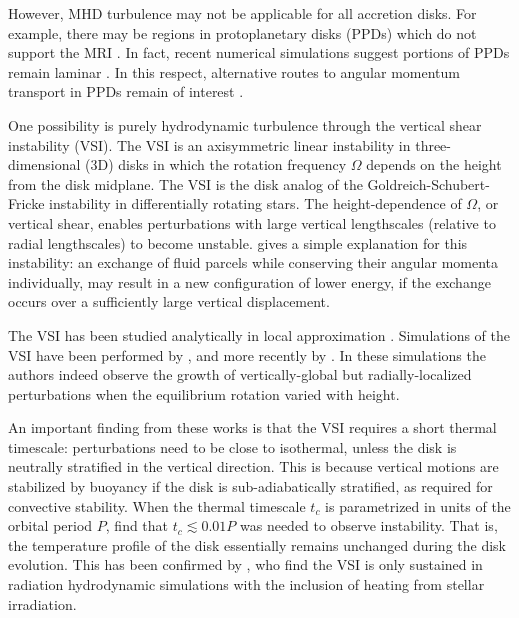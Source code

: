\documentclass[iop]{emulateapj}
\begin{document}
However, MHD turbulence may not be applicable for all  
accretion disks. For example, there may be regions in protoplanetary  
disks (PPDs) which do not support the MRI 
\citep{gammie96,landry13}. In fact, recent  numerical simulations
suggest portions of PPDs remain laminar \citep[e.g.][and references
therein]{lesur14,bai15,gressel15}. In this respect, alternative routes 
to angular momentum transport in PPDs remain of interest
\citep{armitage10}. 
 
One possibility is purely hydrodynamic turbulence through the vertical
shear instability (VSI). The VSI is an axisymmetric linear instability
in three-dimensional (3D) disks in which the rotation frequency
$\Omega$ depends on the height from the disk midplane. The VSI is the
disk analog of the Goldreich-Schubert-Fricke instability
\citep[GSF,][]{goldreich67,fricke68} in differentially rotating stars.   
The height-dependence of $\Omega$, or vertical shear, enables
perturbations with large vertical lengthscales (relative to radial
lengthscales) to become unstable.    
\cite{umurhan13} gives a simple explanation for this 
instability: an exchange of fluid parcels while conserving their
angular momenta individually, may result in a new configuration of
lower energy, if the exchange occurs over a sufficiently large
vertical displacement.  


The VSI has been studied analytically in local approximation
\citep{urpin98,urpin03}. Simulations of the  
VSI have been performed by \cite{arlt04}, and more recently by 
\cite{nelson13}. In these simulations the authors indeed observe the
growth of vertically-global but radially-localized perturbations when
the equilibrium rotation varied with height.  

An important finding from these works is that the VSI requires a short
thermal timescale: perturbations need to be close to
isothermal, unless the disk is neutrally stratified in the vertical
direction. This is because vertical motions are stabilized by
buoyancy if the disk is sub-adiabatically stratified, as required for
convective stability. When the thermal timescale $t_c$ is parametrized
in units of the orbital period $P$, \cite{nelson13} find that
$t_c\lesssim 0.01P$ was needed to observe instability. That is, the
temperature profile of the disk essentially remains unchanged during
the disk evolution. This has been confirmed by 
\cite{stoll14}, who find the 
VSI is only sustained in radiation hydrodynamic simulations 
with the inclusion of heating from stellar irradiation.    
\end{document}
